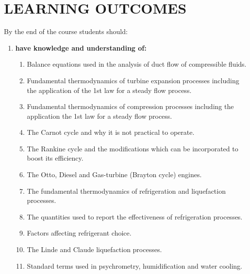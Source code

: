 \documentclass[12pts,a4paper,amsmath,amssymb,floatfix]{article}%
\begin{document}
\section{LEARNING OUTCOMES}
By the end of the course students should:
\begin{enumerate}[{\bf A.}]
\item {\bf have knowledge and understanding of:}
  \begin{enumerate}
    \item Balance equations used in the analysis of duct flow of compressible fluids.
    \item Fundamental thermodynamics of turbine expansion processes including the application of the 1st law for a steady flow process.
    \item Fundamental thermodynamics of compression processes including the application the 1st law for a steady flow process.
    \item The Carnot cycle and why it is not practical to operate.
    \item The Rankine cycle and the modifications which can be incorporated to boost its efficiency.
    \item The Otto, Diesel and Gas-turbine (Brayton cycle) engines.
    \item The fundamental thermodynamics of refrigeration and liquefaction processes.
    \item The quantities used to report the effectiveness of refrigeration processes.
    \item Factors affecting refrigerant choice.
    \item The Linde and Claude liquefaction processes.
    \item Standard terms used in psychrometry, humidification and water cooling.
  \end{enumerate}


\end{enumerate}
\end{document}
